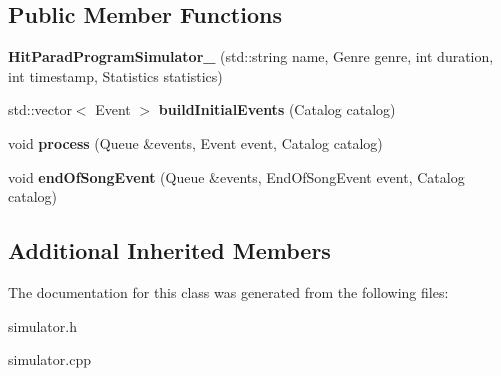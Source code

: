 \subsection*{Public Member Functions}
\begin{DoxyCompactItemize}
\item 
{\bfseries Hit\+Parad\+Program\+Simulator\+\_\+} (std\+::string name, Genre genre, int duration, int timestamp, Statistics statistics)\hypertarget{class_hit_parad_program_simulator___a16b7b8d2f2def1484fe6cdc0b6281262}{}\label{class_hit_parad_program_simulator___a16b7b8d2f2def1484fe6cdc0b6281262}

\item 
std\+::vector$<$ Event $>$ {\bfseries build\+Initial\+Events} (Catalog catalog)\hypertarget{class_hit_parad_program_simulator___af8968cffb656c87cbc2df0d15a2d1421}{}\label{class_hit_parad_program_simulator___af8968cffb656c87cbc2df0d15a2d1421}

\item 
void {\bfseries process} (Queue \&events, Event event, Catalog catalog)\hypertarget{class_hit_parad_program_simulator___a9f9186bbcd925f9df0b62eff80621f1b}{}\label{class_hit_parad_program_simulator___a9f9186bbcd925f9df0b62eff80621f1b}

\item 
void {\bfseries end\+Of\+Song\+Event} (Queue \&events, End\+Of\+Song\+Event event, Catalog catalog)\hypertarget{class_hit_parad_program_simulator___a3f4ef80aa460f9b3a636e1c4241631a3}{}\label{class_hit_parad_program_simulator___a3f4ef80aa460f9b3a636e1c4241631a3}

\end{DoxyCompactItemize}
\subsection*{Additional Inherited Members}


The documentation for this class was generated from the following files\+:\begin{DoxyCompactItemize}
\item 
simulator.\+h\item 
simulator.\+cpp\end{DoxyCompactItemize}
